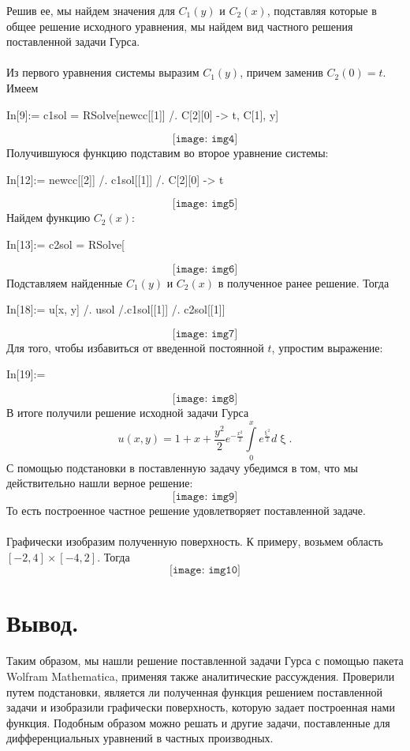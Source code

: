 \documentclass[a4paper, 12pt]{report}
\renewcommand{\xi}{\upxi}
\begin{document}
Решив ее, мы найдем значения для $C_1(y)$ и $C_2(x)$, подставляя которые в общее решение исходного уравнения, мы найдем вид частного решения поставленной задачи Гурса.\\\\
Из первого уравнения системы выразим $C_1(y)$, причем заменив $C_2(0) = t.$ Имеем 
\begin{listingcont}
In[9]:= c1sol = RSolve[newcc[[1]] /. C[2][0] -> t, C[1], y]
\end{listingcont}
$$
\texttt{[image: img4]}
$$
Получившуюся функцию подставим во второе уравнение системы:
\begin{listingcont}
In[12]:= newcc[[2]] /. c1sol[[1]] /. C[2][0] -> t
\end{listingcont}
$$
	\texttt{[image: img5]}
$$
Найдем функцию $C_2(x)$:
\begin{listingcont}
In[13]:= c2sol = RSolve[%
\end{listingcont}
$$
	\texttt{[image: img6]}
$$
Подставляем найденные $C_1(y)$ и $C_2(x)$ в полученное ранее решение. Тогда
\begin{listingcont}
In[18]:= u[x, y] /. usol /.c1sol[[1]] /. c2sol[[1]]
\end{listingcont}
$$
\texttt{[image: img7]}
$$
Для того, чтобы избавиться от введенной постоянной $t$, упростим выражение:
\begin{listingcont}
In[19]:= %
\end{listingcont}
$$
	\texttt{[image: img8]}
$$
В итоге получили решение исходной задачи Гурса $$u(x,y) = 1+x+\dfrac{y^2}{2}e^{-\frac{x^2}{2}}\int\limits_0^x e^{\frac{\xi^2}{2}}d\xi.$$
С помощью подстановки в поставленную задачу убедимся в том, что мы действительно нашли верное решение:
$$
	\texttt{[image: img9]}
$$
То есть построенное частное решение удовлетворяет поставленной задаче.\\\\
Графически изобразим полученную поверхность. К примеру, возьмем область $[-2, 4]\times [-4, 2]$. Тогда
$$
	\texttt{[image: img10]}
$$
\section*{Вывод.}
Таким образом, мы нашли решение поставленной задачи Гурса с помощью пакета Wolfram Mathematica, применяя также аналитические рассуждения. Проверили путем подстановки, является ли полученная функция решением поставленной задачи и изобразили графически поверхность, которую задает построенная нами функция. Подобным образом можно решать и другие задачи, поставленные для дифференциальных уравнений в частных производных.
\end{document}
